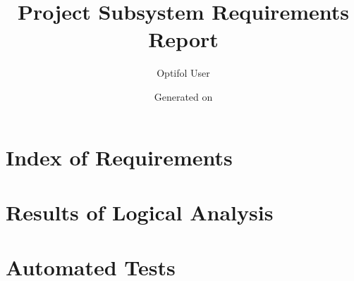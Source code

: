 \documentclass{article}
\title{Project Subsystem Requirements Report}
\author{Optifol User}
\date{Generated on \DTMNow}
\begin{document}
    \maketitle
    \thispagestyle{front}
    \section{Index of Requirements}
    
    \clearpage
    \section{Results of Logical Analysis}
    \clearpage
    \section{Automated Tests}
    
\end{document}
